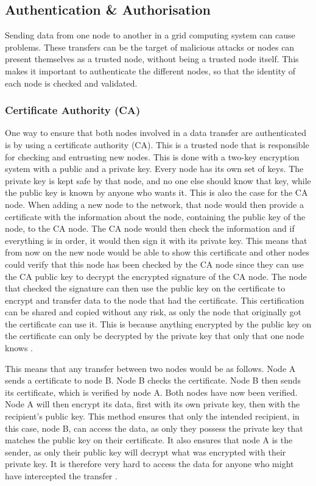 \subsection{Authentication \& Authorisation}
Sending data from one node to another in a grid computing system can cause problems. These transfers can be the target of malicious attacks or nodes can present themselves as a trusted node, without being a trusted node itself. This makes it important to authenticate the different nodes, so that the identity of each node is checked and validated. 

\subsubsection{Certificate Authority (CA)}
One way to ensure that both nodes involved in a data transfer are authenticated is by using a certificate authority (CA). This is a trusted node that is responsible for checking and entrusting new nodes. This is done with a two-key encryption system with a public and a private key. Every node has its own set of keys. The private key is kept safe by that node, and no one else should know that key, while the public key is known by anyone who wants it. This is also the case for the CA node. When adding a new node to the network, that node would then provide a certificate with the information about the node, containing the public key of the node, to the CA node. The CA node would then check the information and if everything is in order, it would then sign it with its private key. This means that from now on the new node would be able to show this certificate and other nodes could verify that this node has been checked by the CA node since they can use the CA public key to decrypt the encrypted signature of the CA node. The node that checked the signature can then use the public key on the certificate to encrypt and transfer data to the node that had the certificate. This certification can be shared and copied without any risk, as only the node that originally got the certificate can use it. This is because anything encrypted by the public key on the certificate can only be decrypted by the private key that only that one node knows \cite{IBM}.

This means that any transfer between two nodes would be as follows. Node A sends a certificate to node B. Node B checks the certificate. Node B then sends its certificate, which is verified by node A. Both nodes have now been verified. Node A will then encrypt its data, first with its own private key, then with the recipient's public key. This method ensures that only the intended recipient, in this case, node B, can access the data, as only they possess the private key that matches the public key on their certificate. It also ensures that node A is the sender, as only their public key will decrypt what was encrypted with their private key. It is therefore very hard to access the data for anyone who might have intercepted the transfer \cite{IBM}.

